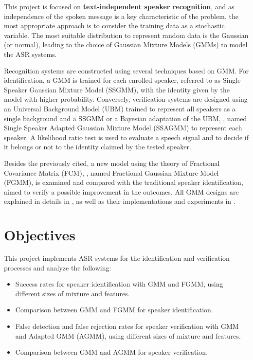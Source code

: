 This project is focused on \textbf{text-independent speaker recognition}, and as independence of the spoken message is a key characteristic of the problem, the most appropriate approach is to consider the training data as a stochastic variable. The most suitable distribution to represent random data is the Gaussian (or normal), leading to the choice of Gaussian Mixture Models (GMMs) to model the ASR systems.

Recognition systems are constructed using several techniques based on GMM. For identification, a GMM is trained for each enrolled speaker, referred to as Single Speaker Gaussian Mixture Model (SSGMM), with the identity given by the model with higher probability. Conversely, verification systems are designed using an Universal Background Model (UBM) trained to represent all speakers as a single background and a SSGMM or a Bayesian adaptation of the UBM, , named Single Speaker Adapted Gaussian Mixture Model (SSAGMM) to represent each speaker. A likelihood ratio test is used to evaluate a speech signal and to decide if it belongs or not to the identity claimed by the tested speaker.

Besides the previously cited, a new model using the theory of Fractional Covariance Matrix (FCM), , named Fractional Gaussian Mixture Model (FGMM), is examined and compared with the traditional speaker identification, aimed to verify a possible improvement in the outcomes. All GMM designs are explained in details in , as well as their implementations and experiments in .

\section{Objectives}

This project implements ASR systems for the identification and verification processes and analyze the following:

\begin{itemize}\itemsep0pt
    \item Success rates for speaker identification with GMM and FGMM, using different sizes of mixture and features.
    \item Comparison between GMM and FGMM for speaker identification.
    \item False detection and false rejection rates for speaker verification with GMM and Adapted GMM (AGMM), using different sizes of mixture and features.
    \item Comparison between GMM and AGMM for speaker verification.
\end{itemize}

